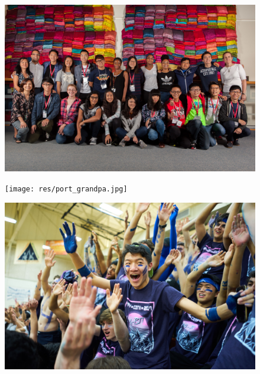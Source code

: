 \documentclass{report}
\begin{document}
\begin{landscape}
  \begin{figure}
    \centering
    \includegraphics[height=\textheight]{res/group_taiwan.jpg}
  \end{figure}
\end{landscape}

\begin{figure}
  \centering
  \texttt{[image: res/port\_grandpa.jpg]}
\end{figure}

\begin{landscape}
  \begin{figure}
    \centering
    \includegraphics[height=\textheight]{res/event_simon.jpg}
  \end{figure}
\end{landscape}
\end{document}
